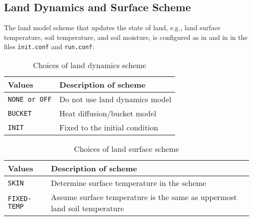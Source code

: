 \subsection{Land Dynamics and Surface Scheme}
The land model scheme that updates the state of land, e.g., land surface temperature, soil temperature, and soil moisture, is configured as in  and  in  in the files \verb|init.conf| and \verb|run.conf|:


\begin{table}[hbt]
\begin{center}
  \caption{Choices of land dynamics scheme}
  \label{tab:nml_land_dyn}
  \begin{tabularx}{150mm}{lX} \hline
    \rowcolor[gray]{0.9}  Values & Description of scheme \\ \hline
      \verb|NONE or OFF| & Do not use land dynamics model \\
      \verb|BUCKET|      & Heat diffusion/bucket model \\
      \verb|INIT|        & Fixed to the initial condition \\
    \hline
  \end{tabularx}
\end{center}
\end{table}

\begin{table}[hbt]
\begin{center}
  \caption{Choices of land surface scheme}
  \label{tab:nml_land_sfc}
  \begin{tabularx}{150mm}{lX} \hline
    \rowcolor[gray]{0.9}  Values & Description of scheme \\ \hline
      \verb|SKIN|       & Determine surface temperature in the scheme \\
      \verb|FIXED-TEMP| & Assume surface temperature is the same as uppermost land soil temperature \\
    \hline
  \end{tabularx}
\end{center}
\end{table}

